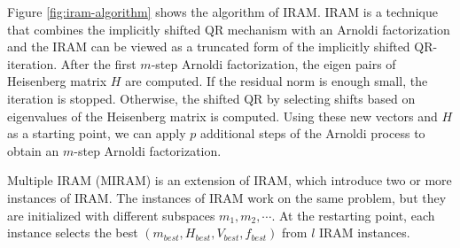 \documentclass[graybox]{svmult}
\begin{document}
Figure \ref{fig:iram-algorithm} shows the algorithm of IRAM. IRAM is 
 a technique that combines the implicitly shifted QR mechanism with an Arnoldi factorization and the IRAM can be viewed as a truncated form of the implicitly shifted QR-iteration.
After the first $m$-step Arnoldi factorization, the eigen pairs of Heisenberg matrix $H$ are computed. If the residual norm is enough small, the iteration is stopped. Otherwise, the shifted QR by selecting shifts based on eigenvalues of the Heisenberg matrix is computed. 
Using these new vectors and $H$ as a starting point, we can apply $p$ additional steps of the Arnoldi process to obtain an $m$-step Arnoldi factorization. 

Multiple IRAM (MIRAM) is an extension of IRAM, which introduce two or more instances of IRAM. 
The instances of IRAM work on the same problem, but they are initialized with different subspaces $m_1, m_2,\cdots $. 
At the restarting point, each instance selects the best $(m_{best}, H_{best}, V_{best}, f_{best})$ from $l$ IRAM instances. 
\end{document}
